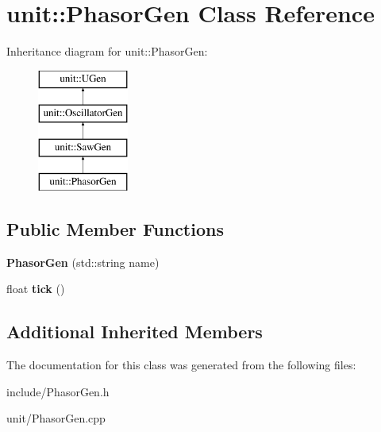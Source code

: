 \hypertarget{classunit_1_1PhasorGen}{}\section{unit\+:\+:Phasor\+Gen Class Reference}
\label{classunit_1_1PhasorGen}
Inheritance diagram for unit\+:\+:Phasor\+Gen\+:\begin{figure}[H]
\begin{center}
\leavevmode
\includegraphics[height=4.000000cm]{classunit_1_1PhasorGen}
\end{center}
\end{figure}
\subsection*{Public Member Functions}
\begin{DoxyCompactItemize}
\item 
{\bfseries Phasor\+Gen} (std\+::string name)\hypertarget{classunit_1_1PhasorGen_a726fab6730e45d7fbf242f4613837e28}{}\label{classunit_1_1PhasorGen_a726fab6730e45d7fbf242f4613837e28}

\item 
float {\bfseries tick} ()\hypertarget{classunit_1_1PhasorGen_a056953090628af9868e4778d15daf79a}{}\label{classunit_1_1PhasorGen_a056953090628af9868e4778d15daf79a}

\end{DoxyCompactItemize}
\subsection*{Additional Inherited Members}


The documentation for this class was generated from the following files\+:\begin{DoxyCompactItemize}
\item 
include/Phasor\+Gen.\+h\item 
unit/Phasor\+Gen.\+cpp\end{DoxyCompactItemize}
